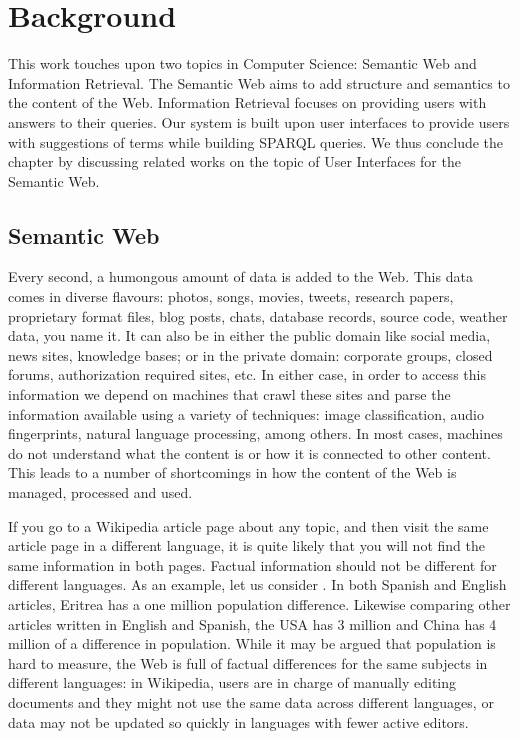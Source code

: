 \chapter{Background}
\label{chap:background}

This work touches upon two topics in Computer Science: Semantic Web and Information Retrieval. The Semantic Web aims to add structure and semantics to the content of the Web. Information Retrieval focuses on providing users with answers to their queries. Our system is built upon user interfaces to provide users with suggestions of terms while building SPARQL queries. We thus conclude the chapter by discussing related works on the topic of User Interfaces for the Semantic Web.


\section{Semantic Web}

Every second, a humongous amount of data is added to the Web. This data comes in diverse flavours: photos, songs, movies, tweets, research papers, proprietary format files, blog posts, chats, database records, source code, weather data, you name it. It can also be in either the public domain like social media, news sites, knowledge bases; or in the private domain: corporate groups, closed forums, authorization required sites, etc. In either case, in order to access this information we depend on machines that crawl these sites and parse the information available using a variety of techniques: image classification, audio fingerprints, natural language processing, among others. In most cases, machines do not understand what the content is or how it is connected to other content. This leads to a number of shortcomings in how the content of the Web is managed, processed and used.

If you go to a Wikipedia article page about any topic, and then visit the same article page in a different language, it is quite likely that you will not find the same information in both pages. Factual information should not be different for different languages. As an example, let us consider . In both Spanish and English articles, Eritrea has a one million population difference. Likewise comparing other articles written in English and Spanish, the USA has 3 million and China has 4 million of a difference in population. While it may be argued that population is hard to measure, the Web is full of factual differences for the same subjects in different languages: in Wikipedia, users are in charge of manually editing documents and they might not use the same data across different languages, or data may not be updated so quickly in languages with fewer active editors.

